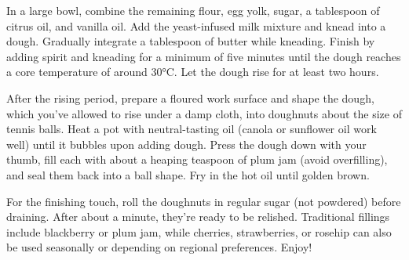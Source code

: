 In a large bowl, combine the remaining flour, egg yolk, sugar, a tablespoon of citrus oil, and vanilla oil. Add the yeast-infused milk mixture and knead into a dough. Gradually integrate a tablespoon of butter while kneading. Finish by adding spirit and kneading for a minimum of five minutes until the dough reaches a core temperature of around 30°C. Let the dough rise for at least two hours.

After the rising period, prepare a floured work surface and shape the dough, which you've allowed to rise under a damp cloth, into doughnuts about the size of tennis balls. Heat a pot with neutral-tasting oil (canola or sunflower oil work well) until it bubbles upon adding dough. Press the dough down with your thumb, fill each with about a heaping teaspoon of plum jam (avoid overfilling), and seal them back into a ball shape. Fry in the hot oil until golden brown.

For the finishing touch, roll the doughnuts in regular sugar (not powdered) before draining. After about a minute, they're ready to be relished. Traditional fillings include blackberry or plum jam, while cherries, strawberries, or rosehip can also be used seasonally or depending on regional preferences. Enjoy!